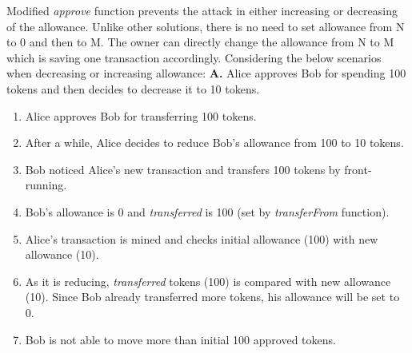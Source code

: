 \noindent Modified \textit{approve} function prevents the attack in either increasing or decreasing of the allowance. Unlike other solutions, there is no need to set allowance from N to 0 and then to M. The owner can directly change the allowance from N to M which is saving one transaction accordingly. Considering the below scenarios when decreasing or increasing allowance:\newline\newline
\noindent \textbf{A.} Alice approves Bob for spending 100 tokens and then decides to decrease it to 10 tokens.
\begin{enumerate}
	\item Alice approves Bob for transferring 100 tokens.
	\item After a while, Alice decides to reduce Bob’s allowance from 100 to 10 tokens.
	\item Bob noticed Alice’s new transaction and transfers 100 tokens by front-running.
	\item Bob’s allowance is 0 and \textit{transferred} is 100 (set by \textit{transferFrom} function).
	\item Alice’s transaction is mined and checks initial allowance (100) with new allowance (10).
	\item As it is reducing, \textit{transferred} tokens (100) is compared with new allowance (10). Since Bob already transferred more tokens, his allowance will be set to 0.
	\item Bob is not able to move more than initial 100 approved tokens.\newline
\end{enumerate}

